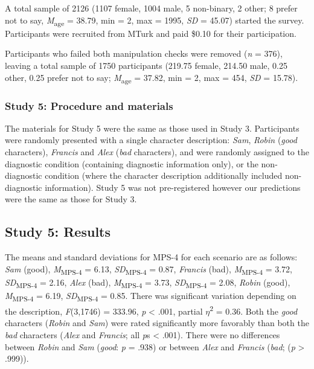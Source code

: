 \documentclass[
  english,
  man,floatsintext]{apa7}
\begin{document}
A total sample of 2126 (1107 female, 1004 male, 5 non-binary, 2 other; 8 prefer not to say, \emph{M}\textsubscript{age} = 38.79, min = 2, max = 1995, \emph{SD} = 45.07) started the survey. Participants were recruited from MTurk and paid \$0.10 for their participation.

Participants who failed both manipulation checks were removed (\emph{n} = 376), leaving a total sample of 1750 participants (219.75 female, 214.50 male, 0.25 other, 0.25 prefer not to say; \emph{M}\textsubscript{age} = 37.82, min = 2, max = 454, \emph{SD} = 15.78).

\hypertarget{study-5-procedure-and-materials}{%
\subsubsection{Study 5: Procedure and materials}\label{study-5-procedure-and-materials}}

The materials for Study 5 were the same as those used in Study 3. Participants were randomly presented with a single character description: \emph{Sam}, \emph{Robin} (\emph{good} characters), \emph{Francis} and \emph{Alex} (\emph{bad} characters), and were randomly assigned to the diagnostic condition (containing diagnostic information only), or the non-diagnostic condition (where the character description additionally included non-diagnostic information). Study 5 was not pre-registered however our predictions were the same as those for Study 3.

\hypertarget{study-5-results}{%
\subsection{Study 5: Results}\label{study-5-results}}

The means and standard deviations for MPS-4 for each scenario are as follows:
\emph{Sam} (good),
\emph{M}\textsubscript{MPS-4} = 6.13, \emph{SD}\textsubscript{MPS-4} = 0.87,
\emph{Francis} (bad),
\emph{M}\textsubscript{MPS-4} = 3.72, \emph{SD}\textsubscript{MPS-4} = 2.16,
\emph{Alex} (bad),
\emph{M}\textsubscript{MPS-4} = 3.73, \emph{SD}\textsubscript{MPS-4} = 2.08,
\emph{Robin} (good),
\emph{M}\textsubscript{MPS-4} = 6.19, \emph{SD}\textsubscript{MPS-4} = 0.85. There was significant variation depending on the description, \emph{F}(3,1746) = 333.96, \emph{p} \textless{} .001, partial \(\eta\)\textsuperscript{2} = 0.36. Both the \emph{good} characters (\emph{Robin} and \emph{Sam}) were rated significantly more favorably than both the \emph{bad} characters (\emph{Alex} and \emph{Francis}; all \emph{p}s \textless{} .001). There were no differences between \emph{Robin} and \emph{Sam} (\emph{good}: \emph{p} = .938) or between \emph{Alex} and \emph{Francis} (\emph{bad}; (\emph{p} \textgreater{} .999)).
\end{document}
